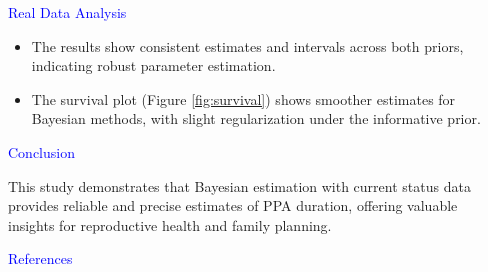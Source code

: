 \documentclass[final]{beamer}
\newlength{\sepwidth}
\newlength{\colwidth}
\newcommand{\separatorcolumn}{\begin{column}{\sepwidth}\end{column}}
\begin{document}
\begin{frame}[t]
\begin{columns}[t]
\begin{column}{\colwidth}
\begin{block}{\textcolor{blue}{Real Data Analysis}}
 \begin{itemize}
      \item The results show consistent estimates and intervals across both priors, indicating robust parameter estimation.
      \vspace{1mm}
      \item The survival plot (Figure \ref{fig:survival}) shows smoother estimates for Bayesian methods, with slight regularization under the informative prior.
  \end{itemize}    
  \end{block}
  
  \begin{block}{\textcolor{blue}{Conclusion}}      
  \end{block}
 This study demonstrates that Bayesian estimation with current status data provides reliable and precise estimates of PPA duration, offering valuable insights for reproductive health and family planning.
  \begin{block}{\textcolor{blue}{References}}
    \nocite{*}    \footnotesize{}
  \end{block}
\end{column}
\separatorcolumn
\end{columns}
\end{frame}
\end{document}
